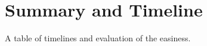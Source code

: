 \documentclass[10pt]{article}
\theoremstyle{definition}
\begin{document}
\section{Summary and Timeline}

A table of timelines and evaluation of the easiness. 














\end{document}

